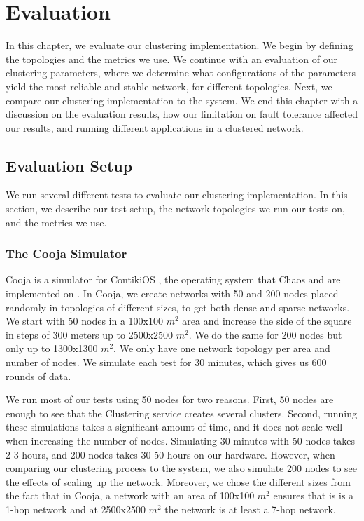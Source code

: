 \chapter{Evaluation}
\label{chap:evaluation}
In this chapter, we evaluate our clustering implementation. We begin by defining the topologies and the metrics we use. We continue with an evaluation of our clustering parameters, where we determine what configurations of the parameters yield the most reliable and stable network, for different topologies. Next, we compare our clustering implementation to the \atwo{} system. We end this chapter with a discussion on the evaluation results, how our limitation on fault tolerance affected our results, and running different applications in a clustered network.


\section{Evaluation Setup}
We run several different tests to evaluate our clustering implementation. In this section, we describe our test setup, the network topologies we run our tests on, and the metrics we use. 

\subsection{The Cooja Simulator}
\label{subsec:cooja-setup}
Cooja \cite{Osterlind2006-cooja-introduction} is a simulator for ContikiOS \cite{Dunkels2004-contiki-introduction}, the operating system that Chaos and \atwo{} are implemented on \cite{chaos-introduction-paper, a2-introduction-paper}. In Cooja, we create networks with 50 and 200 nodes placed randomly in topologies of different sizes, to get both dense and sparse networks. We start with 50 nodes in a 100x100 $m^2$ area and increase the side of the square in steps of 300 meters up to 2500x2500 $m^2$. We do the same for 200 nodes but only up to 1300x1300 $m^2$. We only have one network topology per area and number of nodes. We simulate each test for 30 minutes, which gives us 600 rounds of data. 

We run most of our tests using 50 nodes for two reasons. First, 50 nodes are enough to see that the Clustering service creates several clusters. Second, running these simulations takes a significant amount of time, and it does not scale well when increasing the number of nodes. Simulating 30 minutes with 50 nodes takes 2-3 hours, and 200 nodes takes 30-50 hours on our hardware. However, when comparing our clustering process to the \atwo{} system, we also simulate 200 nodes to see the effects of scaling up the network. Moreover, we chose the different sizes from the fact that in Cooja, a network with an area of 100x100 $m^2$ ensures that is is a 1-hop network and at 2500x2500 $m^2$ the network is at least a 7-hop network.

